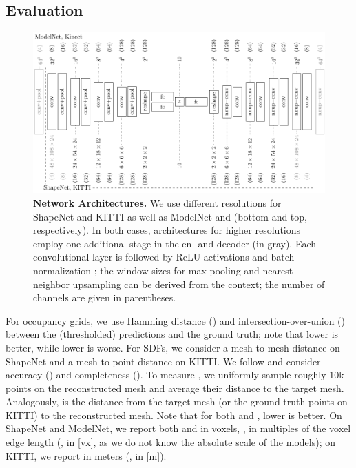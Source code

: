 \subsection{Evaluation}
\label{sec:evaluation}

\begin{figure}
	\vspace*{-\figskipabove px}
	\centering
	\hspace*{-4px}
	\includegraphics[width=1.025\linewidth]{fig_architectures}
	\vspace*{-12px}
	\caption{{\bf Network Architectures.} We use different resolutions for ShapeNet and KITTI as well as ModelNet and \Kinect (bottom and top, respectively). In both cases, architectures for higher resolutions employ one additional stage in the en- and decoder (in {\color{gray}gray}). Each convolutional layer is followed by $\text{ReLU}$ activations and batch normalization \citep{Ioffe2015ICML}; the window sizes for max pooling and nearest-neighbor upsampling can be derived from the context; the number of channels are given in parentheses.}
	\label{fig:architectures}
	\vspace*{-\figskipbelow px}
\end{figure}

For occupancy grids, we use Hamming distance (\Abs) and intersection-over-union (\IoU) between the (thresholded) predictions and the ground truth; note that lower \Abs is better, while lower \IoU is worse. For SDFs, we consider a mesh-to-mesh distance on ShapeNet and a mesh-to-point distance on KITTI. We follow \citep{Jensen2014CVPR} and consider accuracy (\Acc) and completeness (\Compl). To measure \Acc, we uniformly sample roughly $10\text{k}$  points on the reconstructed mesh and average their distance to the target mesh. Analogously, \Compl is the distance from the target mesh (or the ground truth points on KITTI) to the reconstructed mesh. Note that for both \Acc and \Compl, lower is better. On ShapeNet and ModelNet, we report both \Acc and \Compl in voxels, \ie, in multiples of the voxel edge length (\ie, in [vx], as we do not know the absolute scale of the models); on KITTI, we report \Compl in meters (\ie, in [m]).